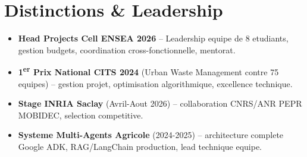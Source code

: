 \documentclass[a4paper,11pt]{article}
\begin{document}
\section{Distinctions \& Leadership}
\begin{itemize}[leftmargin=*, label=\tiny$\bullet$, nosep]
    \item \small{\textbf{Head Projects Cell ENSEA 2026} -- Leadership equipe de 8 etudiants, gestion budgets, coordination cross-fonctionnelle, mentorat.}
    \item \small{\textbf{1\textsuperscript{er} Prix National CITS 2024} (Urban Waste Management contre 75 equipes) -- gestion projet, optimisation algorithmique, excellence technique.}
    \item \small{\textbf{Stage INRIA Saclay} (Avril-Aout 2026) -- collaboration CNRS/ANR PEPR MOBIDEC, selection competitive.}
    \item \small{\textbf{Systeme Multi-Agents Agricole} (2024-2025) -- architecture complete Google ADK, RAG/LangChain production, lead technique equipe.}
\end{itemize}
\end{document}
